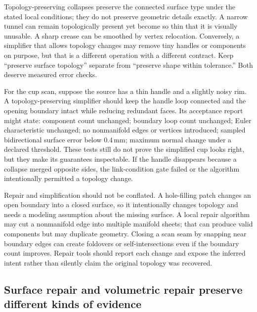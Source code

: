 Topology-preserving collapses preserve the connected surface type under the stated local conditions; they do not preserve geometric details exactly. A narrow tunnel can remain topologically present yet become so thin that it is visually unusable. A sharp crease can be smoothed by vertex relocation. Conversely, a simplifier that allows topology changes may remove tiny handles or components on purpose, but that is a different operation with a different contract. Keep ``preserve surface topology'' separate from ``preserve shape within tolerance.'' Both deserve measured error checks.

For the cup scan, suppose the source has a thin handle and a slightly noisy rim. A topology-preserving simplifier should keep the handle loop connected and the opening boundary intact while reducing redundant faces. Its acceptance report might state: component count unchanged; boundary loop count unchanged; Euler characteristic unchanged; no nonmanifold edges or vertices introduced; sampled bidirectional surface error below \(0.4\,\mathrm{mm}\); maximum normal change under a declared threshold. These tests still do not prove the simplified cup looks right, but they make its guarantees inspectable. If the handle disappears because a collapse merged opposite sides, the link-condition gate failed or the algorithm intentionally permitted a topology change.

Repair and simplification should not be conflated. A hole-filling patch changes an open boundary into a closed surface, so it intentionally changes topology and needs a modeling assumption about the missing surface. A local repair algorithm may cut a nonmanifold edge into multiple manifold sheets; that can produce valid components but may duplicate geometry. Closing a scan seam by snapping near boundary edges can create foldovers or self-intersections even if the boundary count improves. Repair tools should report each change and expose the inferred intent rather than silently claim the original topology was recovered.

\subsection{Surface repair and volumetric repair preserve different kinds of evidence}\label{03-visual-computing-i-ch002-surface-repair-and-volumetric-repair-preserve-different-kinds-of-evidence}

\hypertarget{03-visual-computing-i-ch002-surface-repair-and-volumetric-repair-preserve-different-kinds-of-evidence}{}

